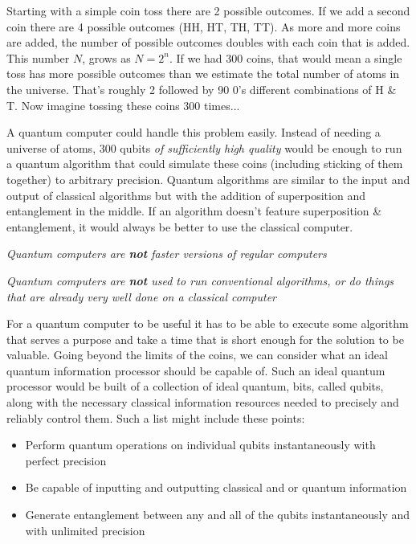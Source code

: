 Starting with a simple coin toss there are 2 possible outcomes. If we add a second coin there are 4 possible outcomes (HH, HT, TH, TT). As more and more coins are added, the number of possible outcomes doubles with each coin that is added. This number $N$, grows as $N = 2^n$. If we had 300 coins, that would mean a single toss has more possible outcomes than we estimate the total number of atoms in the universe. That's roughly 2 followed by 90 0's different combinations of H \& T. Now imagine tossing these coins 300 times...

 A quantum computer could handle this problem easily. Instead of needing a universe of atoms, 300 qubits \textit{of sufficiently high quality} would be enough to run a quantum algorithm that could simulate these coins (including sticking of them together) to arbitrary precision. Quantum algorithms are similar to the input and output of classical algorithms but with the addition of superposition and entanglement in the middle.  If an algorithm doesn't feature superposition \& entanglement, it would always be better to use the classical computer. 


\emph{Quantum computers are \textbf{not} faster versions of regular computers}

\emph{ Quantum computers are \textbf{not} used to run conventional algorithms, or do things that are already very well done on a classical computer }

For a quantum computer to be useful it has to be able to execute some algorithm that serves a purpose and take a time that is short enough for the solution to be valuable. Going beyond the limits of the coins, we can consider what an ideal quantum information processor should be capable of. Such an ideal quantum processor would be built of a collection of ideal quantum, bits, called qubits, along with the necessary classical information resources needed to precisely and reliably control them. Such a list might include these points:

\begin{itemize}
\item Perform quantum operations on individual qubits instantaneously with perfect precision
\item Be capable of inputting and outputting classical and or quantum information
\item Generate entanglement between any and all of the qubits instantaneously and with unlimited precision 
\end{itemize}

